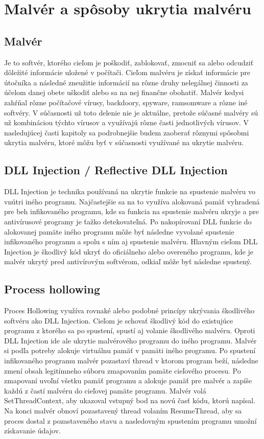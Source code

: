 \section{Malvér a spôsoby ukrytia malvéru}
\noindent
\subsection{Malvér}
\noindent Je to softvér, ktorého cieľom je poškodiť, zablokovať, zmocniť sa alebo odcudziť dôležité informácie uložené v počítači. Cieľom malvéru je získať informácie pre útočníka a následné zneužitie informácií na rôzne druhy nelegálnej činnosti za účelom danej obete uškodiť alebo sa na nej finančne obohatiť. Malvér kedysi zahŕňal rôzne počítačové vírusy, backdoory, spyware, ramsomware a rôzne iné softvéry. V súčasnosti už toto delenie nie je aktuálne, pretože súčasné malvéry sú už kombináciou týchto vírusov a využívajú rôzne časti jednotlivých vírusov. V nasledujúcej časti kapitoly sa podrobnejšie budem zaoberať rôznymi spôsobmi ukrytia malvéru, ktoré môžu byť v súčasnosti využívané na ukrytie malvéru. 

\subsection{DLL Injection / Reflective DLL Injection}
\noindent DLL Injection je technika používaná na ukrytie funkcie na spustenie malvéru vo vnútri iného programu. Najčastejšie sa na to využíva alokovaná pamäť vyhradená pre beh infikovaného programu, kde sa funkcia na spustenie malvéru ukryje a pre antivírusové programy je ťažko detekovateľná. Po nakopírovaní DLL funkcie do alokovanej pamäte iného programu môže byť následne vyvolané spustenie infikovaného programu a spolu s ním aj spustenie malvéru. Hlavným cieľom DLL Injection je škodlivý kód ukryť do oficiálneho alebo overeného programu, kde je malvér ukrytý pred antivírovým softvérom, odkiaľ môže byť následne spustený.

\subsection{Process hollowing}
\noindent Proces Hollowing využíva rovnaké alebo podobné princípy ukrývania škodlivého softvéru ako DLL Injection. Cieľom je schovať škodlivý kód do existujúce programu z ktorého sa po spustení, spustí aj volanie škodlivého malvéru.  Oproti DLL Injection ide ale ukrytie malvérového programu do iného programu. Malvér si podľa potreby alokuje virtuálnu pamäť  v pamäti iného programu. Po spustení infikovaného programu malvér pozastaví thread v ktorom program beží, následne zmení obsah legitímneho súboru zmapovaním pamäte cieľového procesu. Po zmapovaní uvoľní všetku pamäť programu a alokuje pamäť pre malvér a zapíše každú z častí malvéru do cieľovej pamäte programu. Malvér volá SetThreadContext, aby ukazoval vstupný bod na novú časť kódu, ktorú napísal. Na konci malvér obnoví pozastavený thread volaním ResumeThread, aby sa proces dostal z pozastaveného stavu a nasledovným spustením programu umožní získavanie údajov.

